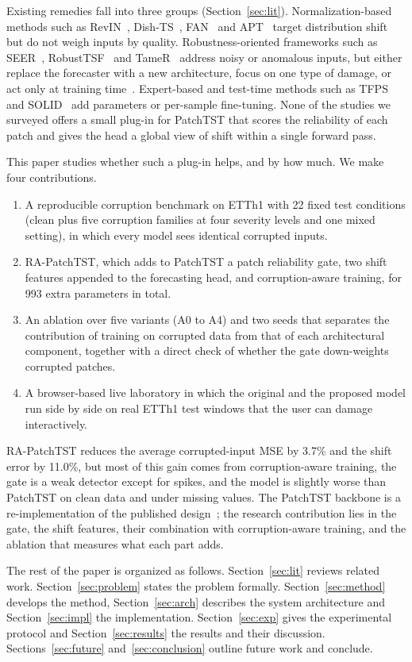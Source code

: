 Existing remedies fall into three groups (Section~\ref{sec:lit}). Normalization-based methods such as RevIN~\cite{revin}, Dish-TS~\cite{dishts}, FAN~\cite{fan} and APT~\cite{apt} target distribution shift but do not weigh inputs by quality. Robustness-oriented frameworks such as SEER~\cite{seer}, RobustTSF~\cite{robusttsf} and TameR~\cite{tamer} address noisy or anomalous inputs, but either replace the forecaster with a new architecture, focus on one type of damage, or act only at training time~\cite{tps}. Expert-based and test-time methods such as TFPS~\cite{tfps} and SOLID~\cite{solid} add parameters or per-sample fine-tuning. None of the studies we surveyed offers a small plug-in for PatchTST that scores the reliability of each patch and gives the head a global view of shift within a single forward pass.

This paper studies whether such a plug-in helps, and by how much. We make four contributions.
\begin{enumerate}
\item A reproducible corruption benchmark on ETTh1 with 22 fixed test conditions (clean plus five corruption families at four severity levels and one mixed setting), in which every model sees identical corrupted inputs.
\item RA-PatchTST, which adds to PatchTST a patch reliability gate, two shift features appended to the forecasting head, and corruption-aware training, for 993 extra parameters in total.
\item An ablation over five variants (A0 to A4) and two seeds that separates the contribution of training on corrupted data from that of each architectural component, together with a direct check of whether the gate down-weights corrupted patches.
\item A browser-based live laboratory in which the original and the proposed model run side by side on real ETTh1 test windows that the user can damage interactively.
\end{enumerate}

RA-PatchTST reduces the average corrupted-input MSE by 3.7\% and the shift error by 11.0\%, but most of this gain comes from corruption-aware training, the gate is a weak detector except for spikes, and the model is slightly worse than PatchTST on clean data and under missing values. The PatchTST backbone is a re-implementation of the published design~\cite{patchtst,patchtst_code}; the research contribution lies in the gate, the shift features, their combination with corruption-aware training, and the ablation that measures what each part adds.

The rest of the paper is organized as follows. Section~\ref{sec:lit} reviews related work. Section~\ref{sec:problem} states the problem formally. Section~\ref{sec:method} develops the method, Section~\ref{sec:arch} describes the system architecture and Section~\ref{sec:impl} the implementation. Section~\ref{sec:exp} gives the experimental protocol and Section~\ref{sec:results} the results and their discussion. Sections~\ref{sec:future} and~\ref{sec:conclusion} outline future work and conclude.
